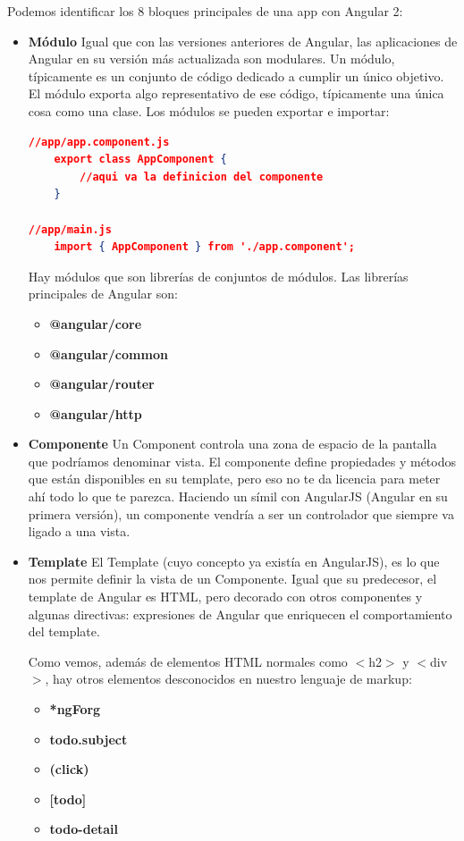 Podemos identificar los 8 bloques principales de una app con Angular 2:
\begin{itemize}

\item \textbf{Módulo} Igual que con las versiones anteriores de Angular, las aplicaciones de Angular en su versión más actualizada son modulares. Un módulo, típicamente es un conjunto de código dedicado a cumplir un único objetivo. El módulo exporta algo representativo de ese código, típicamente una única cosa como una clase. Los módulos se pueden exportar e importar:

 \begin{lstlisting}[language=JSON] 
//app/app.component.js
    export class AppComponent {
        //aqui va la definicion del componente
    }
 
//app/main.js
    import { AppComponent } from './app.component';
\end{lstlisting}
   
Hay módulos que son librerías de conjuntos de módulos. Las librerías principales de Angular son:
\begin{itemize}
\item \textbf{@angular/core}
\item \textbf{@angular/common}
\item \textbf{@angular/router}
\item \textbf{@angular/http}
\end{itemize}

\item \textbf{Componente} Un Component controla una zona de espacio de la pantalla que podríamos denominar vista. El componente define propiedades y métodos que están disponibles en su template, pero eso no te da licencia para meter ahí todo lo que te parezca. Haciendo un símil con AngularJS (Angular en su primera versión), un componente vendría a ser un controlador que siempre va ligado a una vista.
\item \textbf{Template} El Template (cuyo concepto ya existía en AngularJS), es lo que nos permite definir la vista de un Componente.
Igual que su predecesor, el template de Angular es HTML, pero decorado con otros componentes y algunas directivas: expresiones de Angular que enriquecen el comportamiento del template.

Como vemos, además de elementos HTML normales como $<$h2$>$ y $<$div$>$, hay otros elementos desconocidos en nuestro lenguaje de markup:
\begin{itemize}
\item \textbf{*ngForg}
\item \textbf{todo.subject}
\item \textbf{(click)}
\item \textbf{[todo]}
\item \textbf{todo-detail}
\end{itemize}


\end{itemize}
